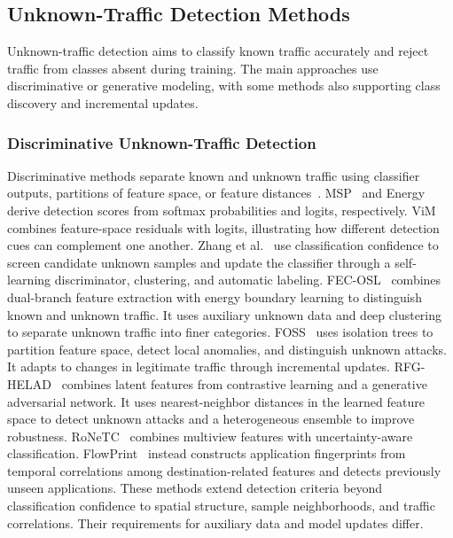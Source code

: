 \documentclass[journal]{IEEEtran}
\newcommand{\bluecite}[1]{\textcolor{blue}{\cite{#1}}}
\begin{document}
\subsection{Unknown-Traffic Detection Methods}
Unknown-traffic detection aims to classify known traffic accurately and reject traffic from classes absent during training. The main approaches use discriminative or generative modeling, with some methods also supporting class discovery and incremental updates.

\subsubsection{Discriminative Unknown-Traffic Detection}
Discriminative methods separate known and unknown traffic using classifier outputs, partitions of feature space, or feature distances~\bluecite{react}. MSP~\bluecite{ch2-17} and Energy~\bluecite{ch2-18} derive detection scores from softmax probabilities and logits, respectively. ViM~\bluecite{vim} combines feature-space residuals with logits, illustrating how different detection cues can complement one another. Zhang et al.~\bluecite{ch2-9} use classification confidence to screen candidate unknown samples and update the classifier through a self-learning discriminator, clustering, and automatic labeling. FEC-OSL~\bluecite{ch2-10} combines dual-branch feature extraction with energy boundary learning to distinguish known and unknown traffic. It uses auxiliary unknown data and deep clustering to separate unknown traffic into finer categories. FOSS~\bluecite{ch2-11} uses isolation trees to partition feature space, detect local anomalies, and distinguish unknown attacks. It adapts to changes in legitimate traffic through incremental updates. RFG-HELAD~\bluecite{ch2-12} combines latent features from contrastive learning and a generative adversarial network. It uses nearest-neighbor distances in the learned feature space to detect unknown attacks and a heterogeneous ensemble to improve robustness. RoNeTC~\bluecite{ch2-16} combines multiview features with uncertainty-aware classification. FlowPrint~\bluecite{flowprint} instead constructs application fingerprints from temporal correlations among destination-related features and detects previously unseen applications. These methods extend detection criteria beyond classification confidence to spatial structure, sample neighborhoods, and traffic correlations. Their requirements for auxiliary data and model updates differ.
\end{document}
